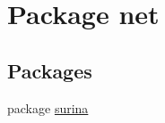 \hypertarget{namespacenet}{}\section{Package net}
\label{namespacenet}
\subsection*{Packages}
\begin{DoxyCompactItemize}
\item 
package \hyperlink{namespacenet_1_1surina}{surina}
\end{DoxyCompactItemize}
